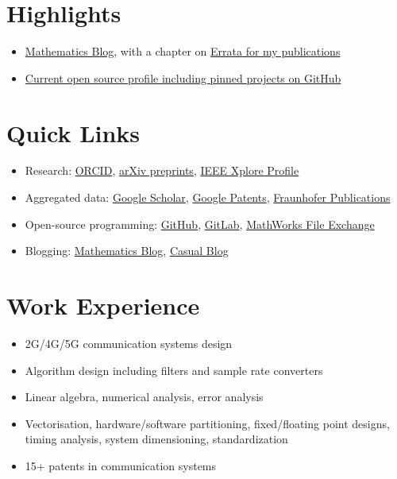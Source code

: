 \documentclass[a4paper,dvipsnames]{report}
\begin{document}
\section*{Highlights}
\begin{itemize}
	\item \href{https://aravindh-krishnamoorthy.github.io/ark-math/}{Mathematics Blog}, with a chapter on \href{https://aravindh-krishnamoorthy.github.io/ark-math/Ch4.html}{Errata for my publications}
	\item \href{https://github.com/aravindh-krishnamoorthy}{Current open source profile including pinned projects on GitHub}
\end{itemize}
\hrulefill
\section*{Quick Links}
\begin{itemize}
	\item Research: \href{https://orcid.org/0000-0001-7186-121X}{ORCID}, \href{https://arxiv.org/a/krishnamoorthy_a_1.html}{arXiv preprints}, \href{https://ieeexplore.ieee.org/author/37086238080}{IEEE Xplore Profile}
	\item Aggregated data: \href{https://scholar.google.com/citations?user=eLf3E1kAAAAJ&hl=en}{Google Scholar}, \href{https://patents.google.com/?inventor=aravindh+krishnamoorthy}{Google Patents}, \href{http://publica.fraunhofer.de/autoren/Krishnamoorthy,%20A}{Fraunhofer Publications}
	\item Open-source programming: \href{https://github.com/aravindh-krishnamoorthy}{GitHub}, \href{https://gitlab.com/aravindh.krishnamoorthy}{GitLab}, \href{https://www.mathworks.com/matlabcentral/profile/authors/3862426}{MathWorks File Exchange}
	\item Blogging: \href{https://aravindh-krishnamoorthy.github.io/ark-math/}{Mathematics Blog}, \href{http://aravindhk.blogspot.com/}{Casual Blog}	
\end{itemize}
\hrulefill
\section*{Work Experience}
\begin{itemize}
	\item 2G/4G/5G communication systems design
	\item Algorithm design including filters and sample rate converters
	\item Linear algebra, numerical analysis, error analysis
	\item Vectorisation, hardware/software partitioning, fixed/floating point designs, timing analysis, system dimensioning, standardization
	\item 15+ patents in communication systems
\end{itemize}
\hrulefill
\end{document}

